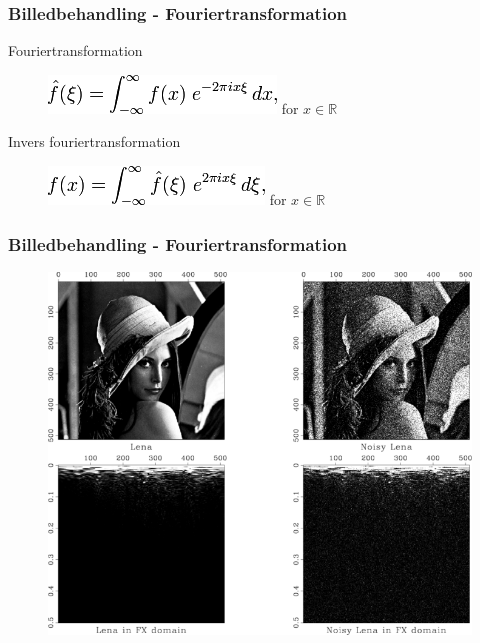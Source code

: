 \documentclass[12pt,t]{beamer}
\begin{document}
\begin{frame}
\frametitle{Billedbehandling - Fouriertransformation}
Fouriertransformation
\begin{figure}[H]
\includegraphics[scale=0.35]{img/billedbeh/fourier.png}
\hspace{0.1cm}  for $x \in \mathbb{R}$
\end{figure}
Invers fouriertransformation
\begin{figure}[H]
\includegraphics[scale=0.35]{img/billedbeh/fourier_invers.png}
\hspace{0.1cm}  for $x \in \mathbb{R}$
\end{figure}
\end{frame}

\begin{frame}
\frametitle{Billedbehandling - Fouriertransformation}
\begin{figure}[H]
\includegraphics[scale=0.33]{img/billedbeh/lenaex.png}
\end{figure}
\end{frame}
\end{document}
